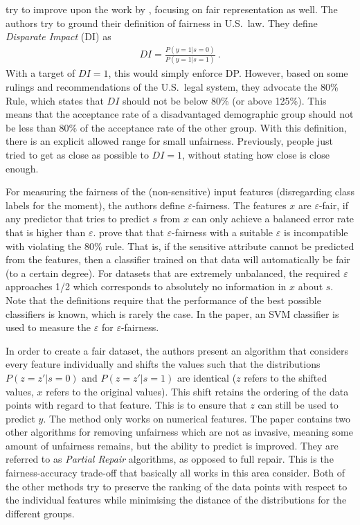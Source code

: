\citet{feldman2015certifying} try to improve upon the work by \citet{zemel2013learning},
focusing on fair representation as well.
The authors try to ground their definition of fairness in U.S.\ law.
They define \emph{Disparate Impact} (DI) as
\begin{align}
  \label{eq:disparate-impace}
  DI = \frac{P(y=1|s=0)}{P(y=1|s=1)} ~.
\end{align}
With a target of \(DI = 1\), this would simply enforce \ac{DP}.
However, based on some rulings and recommendations of the U.S.\ legal system,
they advocate the 80\% Rule, which states that \(DI\) should not be below 80\% (or above 125\%).
This means that the acceptance rate of a disadvantaged demographic group
should not be less than 80\% of the acceptance rate of the other group.
With this definition, there is an explicit allowed range for small unfairness.
Previously, people just tried to get as close as possible to \(DI = 1\),
without stating how close is close enough.

For measuring the fairness of the (non-sensitive) input features
(disregarding class labels for the moment), the authors define \(\varepsilon\)-fairness.
The features \(x\) are \(\varepsilon\)-fair,
if any predictor that tries to predict \(s\) from \(x\) can only achieve a balanced error rate
that is higher than \(\varepsilon\).
\citet{feldman2015certifying} prove that that \(\varepsilon\)-fairness with a suitable \(\varepsilon\)
is incompatible with violating the 80\% rule.
That is, if the sensitive attribute cannot be predicted from the features,
then a classifier trained on that data will automatically be fair (to a certain degree).
For datasets that are extremely unbalanced,
the required \(\varepsilon\) approaches 1/2
which corresponds to absolutely no information in \(x\) about \(s\).
Note that the definitions require that the performance of the best possible classifiers is known,
which is rarely the case.
In the paper, an \ac{SVM} classifier is used to measure the \(\varepsilon\) for \(\varepsilon\)-fairness.

In order to create a fair dataset,
the authors present an algorithm that considers every feature individually
and shifts the values such that the distributions \(P(z=z'|s=0)\) and \(P(z=z'|s=1)\) are identical
(\(z\) refers to the shifted values, \(x\) refers to the original values).
This shift retains the ordering of the data points with regard to that feature.
This is to ensure that \(z\) can still be used to predict \(y\).
The method only works on numerical features.
The paper contains two other algorithms for removing unfairness which are not as invasive,
meaning some amount of unfairness remains, but the ability to predict is improved.
They are referred to as \emph{Partial Repair} algorithms, as opposed to full repair.
This is the fairness-accuracy trade-off that basically all works in this area consider.
Both of the other methods try to preserve the ranking of the data points
with respect to the individual features
while minimising the distance of the distributions for the different groups.


